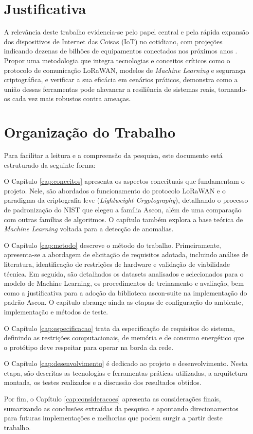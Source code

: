 \section{Justificativa}
A relevância deste trabalho evidencia-se pelo papel central e pela rápida expansão dos dispositivos de Internet das Coisas (IoT) no cotidiano, com projeções indicando dezenas de bilhões de equipamentos conectados nos próximos anos \cite{pandey2025}. Propor uma metodologia que integra tecnologias e conceitos críticos como o protocolo de comunicação LoRaWAN, modelos de \textit{Machine Learning} e segurança criptográfica, e verificar a sua eficácia em cenários práticos, demonstra como a união dessas ferramentas pode alavancar a resiliência de sistemas reais, tornando-os cada vez mais robustos contra ameaças.


\section{Organização do Trabalho}
Para facilitar a leitura e a compreensão da pesquisa, este documento está estruturado da seguinte forma:

O Capítulo \ref{cap:conceitos} apresenta os aspectos conceituais que fundamentam o projeto. Nele, são abordados o funcionamento do protocolo LoRaWAN e o paradigma da criptografia leve (\textit{Lightweight Cryptography}), detalhando o processo de padronização do NIST que elegeu a família Ascon, além de uma comparação com outras famílias de algoritmos. O capítulo também explora a base teórica de \textit{Machine Learning} voltada para a detecção de anomalias.

O Capítulo \ref{cap:metodo} descreve o método do trabalho. Primeiramente, apresenta-se a 
abordagem de elicitação de requisitos adotada, incluindo análise de 
literatura, identificação de restrições de hardware e validação de 
viabilidade técnica. Em seguida, são detalhados os datasets analisados e 
selecionados para o modelo de Machine Learning, os procedimentos de 
treinamento e avaliação, bem como a justificativa para a adoção da 
biblioteca ascon-suite na implementação do padrão Ascon. O capítulo abrange 
ainda as etapas de configuração do ambiente, implementação e métodos de teste.

O Capítulo \ref{cap:especificacao} trata da especificação de requisitos do sistema, definindo as restrições computacionais, de memória e de consumo energético que o protótipo deve respeitar para operar na borda da rede.

O Capítulo \ref{cap:desenvolvimento} é dedicado ao projeto e desenvolvimento. Nesta etapa, são descritas as tecnologias e ferramentas práticas utilizadas, a arquitetura montada, os testes realizados e a discussão dos resultados obtidos.

Por fim, o Capítulo \ref{cap:consideracoes} apresenta as considerações finais, sumarizando as conclusões extraídas da pesquisa e apontando direcionamentos para futuras implementações e melhorias que podem surgir a partir deste trabalho.
